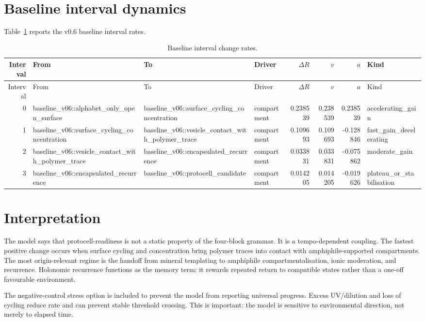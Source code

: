 \documentclass[11pt]{article}
\begin{document}
\section{Baseline interval dynamics}
Table~\ref{tab:intervals} reports the v0.6 baseline interval rates.

\begin{longtable}{rlllrrrl}
\caption{Baseline interval change rates.}\label{tab:intervals}\\
\toprule
Interval & From & To & Driver & $\Delta R$ & $v$ & $a$ & Kind \\
\midrule
\endfirsthead
\toprule
Interval & From & To & Driver & $\Delta R$ & $v$ & $a$ & Kind \\
\midrule
\endhead
0 & baseline\_v06::alphabet\_only\_open\_surface & baseline\_v06::surface\_cycling\_concentration & compartment & 0.238539 & 0.238539 & 0.238539 & accelerating\_gain \\
1 & baseline\_v06::surface\_cycling\_concentration & baseline\_v06::vesicle\_contact\_with\_polymer\_trace & compartment & 0.109693 & 0.109693 & -0.128846 & fast\_gain\_decelerating \\
2 & baseline\_v06::vesicle\_contact\_with\_polymer\_trace & baseline\_v06::encapsulated\_recurrence & compartment & 0.033831 & 0.033831 & -0.075862 & moderate\_gain \\
3 & baseline\_v06::encapsulated\_recurrence & baseline\_v06::protocell\_candidate & compartment & 0.014205 & 0.014205 & -0.019626 & plateau\_or\_stabilisation \\
\bottomrule
\end{longtable}

\section{Interpretation}
The model says that protocell-readiness is not a static property of the four-block grammar.  It is a tempo-dependent coupling.  The fastest positive change occurs when surface cycling and concentration bring polymer traces into contact with amphiphile-supported compartments.  The most origin-relevant regime is the handoff from mineral templating to amphiphile compartmentalisation, ionic moderation, and recurrence.  Holonomic recurrence functions as the memory term: it rewards repeated return to compatible states rather than a one-off favourable environment.

The negative-control stress option is included to prevent the model from reporting universal progress. Excess UV/dilution and loss of cycling reduce rate and can prevent stable threshold crossing.  This is important: the model is sensitive to environmental direction, not merely to elapsed time.
\end{document}
